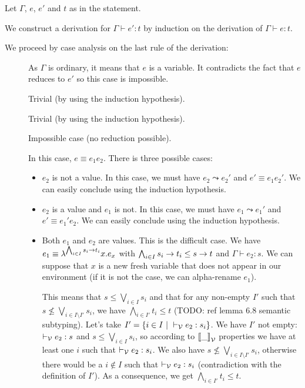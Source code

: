 \documentclass[a4paper]{article}
\theoremstyle{definition}
\begin{document}
        Let $\Gamma$, $e$, $e'$ and $t$ as in the statement.

        We construct a derivation for $\Gamma \vdash e':t$ by induction on the derivation of $\Gamma \vdash e:t$.

        We proceed by case analysis on the last rule of the derivation:
        
        \begin{description}
          \item[] As $\Gamma$ is ordinary, it means that $e$ is a variable.
          It contradicts the fact that $e$ reduces to $e'$ so this case is impossible. 
          \item[] Trivial (by using the induction hypothesis).
          \item[] Trivial (by using the induction hypothesis).
          \item[] Impossible case (no reduction possible).
          \item[] In this case, $e\equiv e_1 e_2$.
          There is three possible cases:
          \begin{itemize}
            \item $e_2$ is not a value. In this case, we must have $e_2\leadsto e_2'$
            and $e'\equiv e_1 e_2'$. We can easily conclude using the induction hypothesis.
            \item $e_2$ is a value and $e_1$ is not. In this case, we must have $e_1\leadsto e_1'$
            and $e'\equiv e_1' e_2$. We can easily conclude using the induction hypothesis.
            \item Both $e_1$ and $e_2$ are values. This is the difficult case.
            We have $e_1\equiv \lambda^{\bigwedge_{i\in I}s_i\to t_i}x.e_x$
            with $\bigwedge_{i\in I}s_i\to t_i \leq s\to t$ and $\Gamma \vdash e_2:s$.
            We can suppose that $x$ is a new fresh variable that does not appear in our environment
            (if it is not the case, we can alpha-rename $e_1$).

            This means that $s\leq \bigvee_{i\in I} s_i$ and that for any non-empty $I'$ such that
            $s\not\leq \bigvee_{i\in I\setminus I'} s_i$, we have $\bigwedge_{i\in I'} t_i \leq t$
            (TODO: ref lemma 6.8 semantic subtyping). Let's take $I'=\{i\in I~|~ \vdash_{\mathcal{V}} e_2:s_i\}$.
            We have $I'$ not empty: $\vdash_{\mathcal{V}} e_2:s$ and $s\leq \bigvee_{i\in I} s_i$, so according to
            ${\llbracket \_ \rrbracket}_{\mathcal{V}}$ properties we have at least one $i$ such that $\vdash_{\mathcal{V}} e_2:s_i$.
            We also have $s\not\leq \bigvee_{i\in I\setminus I'} s_i$, otherwise there would be a $i\not\in I$
            such that $\vdash_{\mathcal{V}} e_2: s_i$ (contradiction with the definition of $I'$).
            As a consequence, we get $\bigwedge_{i\in I'} t_i \leq t$.


\end{itemize}
\end{description}
\end{document}

